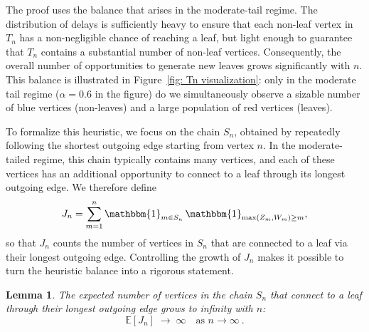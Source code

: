 \documentclass[12pt]{article}
\newcommand{\E}{\mathbb{E}}
\newtheorem{lemma}[theorem]{Lemma}
\numberwithin{equation}{section} \font\titre=cmbx12
\def\IND{\mathbbm{1}}
\begin{document}
The proof uses the balance that arises in the moderate-tail regime. The distribution of delays is sufficiently heavy to ensure that each non-leaf vertex in $T_n$ has a non-negligible chance of reaching a leaf, but light enough to guarantee that $T_n$ contains a substantial number of non-leaf vertices. Consequently, the overall number of opportunities to generate new leaves grows significantly with $n$. This balance is illustrated in Figure~\ref{fig: Tn visualization}: only in the moderate tail regime ($\alpha = 0.6$ in the figure) do we simultaneously observe a sizable number of blue vertices (non-leaves) and a large population of red vertices (leaves).  

To formalize this heuristic, we focus on the chain $S_n$, obtained by repeatedly following the shortest outgoing edge starting from vertex $n$. In the moderate-tailed regime, this chain typically contains many vertices, and each of these vertices has an additional opportunity to connect to a leaf through its longest outgoing edge. We therefore define
\[
J_n = \sum_{m=1}^n \IND_{m \in S_n}\,\IND_{\max(Z_m, W_m) \ge m},
\]
so that $J_n$ counts the number of vertices in $S_n$ that are connected to a leaf via their longest outgoing edge. Controlling the growth of $J_n$ makes it possible to turn the heuristic balance into a rigorous statement.

\color{black}

\begin{lemma}\label{Divergence}
The expected number of vertices in the chain $S_n$ that connect to a leaf through their longest outgoing edge grows to infinity with $n$:
\[
\E[J_n] \;\to\; \infty \quad \text{as } n \to \infty~.
\]
\end{lemma}
\end{document}
